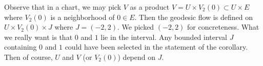 \documentclass[a5paper,10pt,twoside]{article}
\theoremstyle{plain}
\theoremstyle{definition}
\theoremstyle{remark}
\begin{document}
Observe that in a chart, we may pick $V$ as a product $V=U\times V_2(0)\subset U\times E$ where $V_2(0)$ is a neighborhood of $0\in E$. Then the geodesic flow is defined on $U\times V_2(0)\times J $ where $J=(-2,2)$. We picked $(-2, 2)$ for concreteness. What we really want is that $0$ and $1$ lie in the interval. Any bounded interval $J$ containing $0$ and $1$ could have been selected in the statement of the corollary. Then of course, $U$ and $V$ (or $V_2(0)$) depend on $J.$
\end{document}
